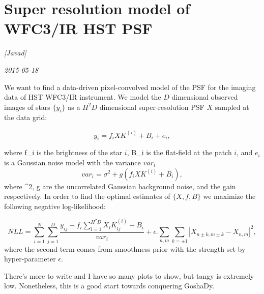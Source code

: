 \documentclass[12pt, pdftex]{article}
\begin{document}
\section*{Super resolution model of WFC3/IR HST PSF}
\noindent
\textsl{[Javad]}

\noindent
\textsl{2015-05-18}

We want to find a data-driven pixel-convolved model of the PSF for the imaging data of HST WFC3/IR
instrument. We model the $D$ dimensional observed images of stars $\{y_i\}$ as a $H^2D$ dimensional 
super-resolution PSF $X$ sampled at the data grid:

\begin{equation}
y_i= f_iXK^{(i)} + B_i + e_i,
\end{equation}

where f_i is the brightness of the star $i$, B_i is the flat-field at the patch $i$, and $e_i$ is 
a Gaussian noise model with the variance $var_i$
\begin{equation}
var_i = \sigma^{2} + g(f_iXK^{(i)} + B_i),
\end{equation}
where \sigma^{2}, g are the uncorrelated Gaussian background noise, and the gain respectively.
In order to find the optimal estimates of $\{X,f,B\}$ we maximize the following negative log-likelihood:

\begin{equation}
NLL = \sum_{i=1}^{N}\sum_{j=1}^{D} \frac{y_{ij} - f_{i}\sum_{l=1}^{H^{2}D}X_{l}K^{(i)}_{lj}-B_{i}}{var_{i}} + \epsilon.\sum_{n,m}\sum_{k=\pm1} |X_{n\pm k,m\pm k}-X_{n,m}|^{2},
\end{equation}
where the second term comes from smoothness prior with the strength set by hyper-parameter $\epsilon$.

There's more to write and I have so many plots to show, but tangy is extremely low. Nonetheless, this is a good start towards conquering GoshaDy.
 
\end{document}
